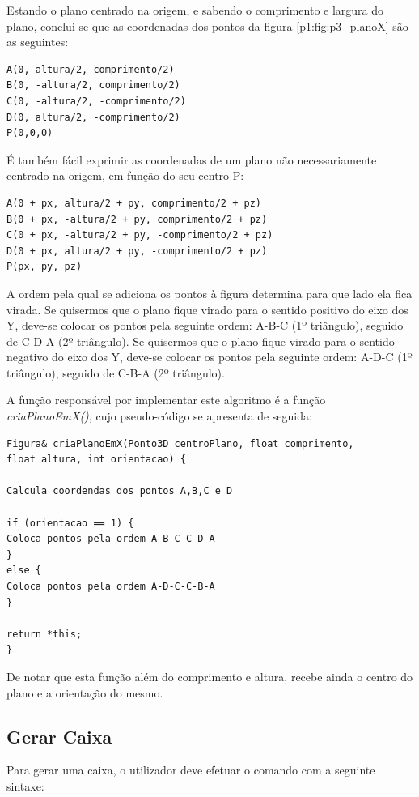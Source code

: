 Estando o plano centrado na origem, e sabendo o comprimento e largura do plano, conclui-se que as coordenadas dos pontos da figura \ref{p1:fig:p3_planoX} são as seguintes:

\begin{Verbatim}
A(0, altura/2, comprimento/2)
B(0, -altura/2, comprimento/2)
C(0, -altura/2, -comprimento/2)
D(0, altura/2, -comprimento/2)
P(0,0,0)
\end{Verbatim}

É também fácil exprimir as coordenadas de um plano não necessariamente centrado na origem, em função do seu centro P:

\begin{Verbatim}
A(0 + px, altura/2 + py, comprimento/2 + pz)
B(0 + px, -altura/2 + py, comprimento/2 + pz)
C(0 + px, -altura/2 + py, -comprimento/2 + pz)
D(0 + px, altura/2 + py, -comprimento/2 + pz)
P(px, py, pz)
\end{Verbatim}

A ordem pela qual se adiciona os pontos à figura determina para que lado ela fica virada. Se quisermos que o plano fique virado para o sentido positivo do eixo dos Y, deve-se colocar os pontos pela seguinte ordem: A-B-C (1º triângulo), seguido de C-D-A (2º triângulo). Se quisermos que o plano fique virado para o sentido negativo do eixo dos Y, deve-se colocar os pontos pela seguinte ordem: A-D-C (1º triângulo), seguido de C-B-A (2º triângulo).

A função responsável por implementar este algoritmo é a função \textit{criaPlanoEmX()}, cujo pseudo-código se apresenta de seguida:

\begin{Verbatim}
Figura& criaPlanoEmX(Ponto3D centroPlano, float comprimento, 
float altura, int orientacao) {

Calcula coordendas dos pontos A,B,C e D

if (orientacao == 1) {
Coloca pontos pela ordem A-B-C-C-D-A
}
else {
Coloca pontos pela ordem A-D-C-C-B-A
}

return *this;
}
\end{Verbatim}

De notar que esta função além do comprimento e altura, recebe ainda o centro do plano e a orientação do mesmo.

\subsection{Gerar Caixa}

Para gerar uma caixa, o utilizador deve efetuar o comando com a seguinte sintaxe:

